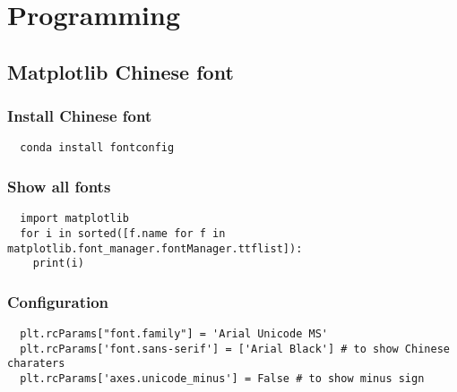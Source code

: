 
\chapter{Programming}

\section{Matplotlib Chinese font}

\subsection{Install Chinese font}

\lstset{language=Sh}
\begin{lstlisting}
  conda install fontconfig
\end{lstlisting}

\subsection{Show all fonts}
\lstset{language=Python}
\begin{lstlisting}
  import matplotlib
  for i in sorted([f.name for f in matplotlib.font_manager.fontManager.ttflist]):
    print(i)
\end{lstlisting}

  
\subsection{Configuration}
\begin{lstlisting}
  plt.rcParams["font.family"] = 'Arial Unicode MS'
  plt.rcParams['font.sans-serif'] = ['Arial Black'] # to show Chinese charaters
  plt.rcParams['axes.unicode_minus'] = False # to show minus sign
\end{lstlisting}
